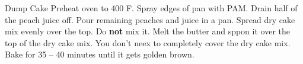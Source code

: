 \documentclass[../main.tex]{subfiles}
\begin{document}
\begin{recipe}{Dump Cake}{}{}
    Preheat oven to 400 \degrees{}F. Spray edges of pan with PAM.
    Drain half of the peach juice off. Pour remaining peaches and juice in a
    pan.
    Spread dry cake mix evenly over the top. Do \textbf{not} mix it.
    Melt the butter and sppon it over the top of the dry cake mix. You don't
    neex to completely cover the dry cake mix. Bake for 35 -- 40 minutes until
    it gets golden brown.
\end{recipe}
\end{document}
